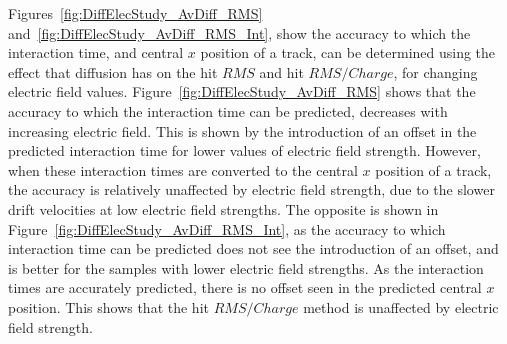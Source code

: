 
Figures~\ref{fig:DiffElecStudy_AvDiff_RMS} and~\ref{fig:DiffElecStudy_AvDiff_RMS_Int}, show the accuracy to which the interaction time, and central $x$ position of a track, can be determined using the effect that diffusion has on the hit $RMS$ and hit $RMS/Charge$, for changing electric field values. Figure~\ref{fig:DiffElecStudy_AvDiff_RMS} shows that the accuracy to which the interaction time can be predicted, decreases with increasing electric field. This is shown by the introduction of an offset in the predicted interaction time for lower values of electric field strength. However, when these interaction times are converted to the central $x$ position of a track, the accuracy is relatively unaffected by electric field strength, due to the slower drift velocities at low electric field strengths. The opposite is shown in Figure~\ref{fig:DiffElecStudy_AvDiff_RMS_Int}, as the accuracy to which interaction time can be predicted does not see the introduction of an offset, and is better for the samples with lower electric field strengths. As the interaction times are accurately predicted, there is no offset seen in the predicted central $x$ position. This shows that the hit $RMS/Charge$ method is unaffected by electric field strength. \\

